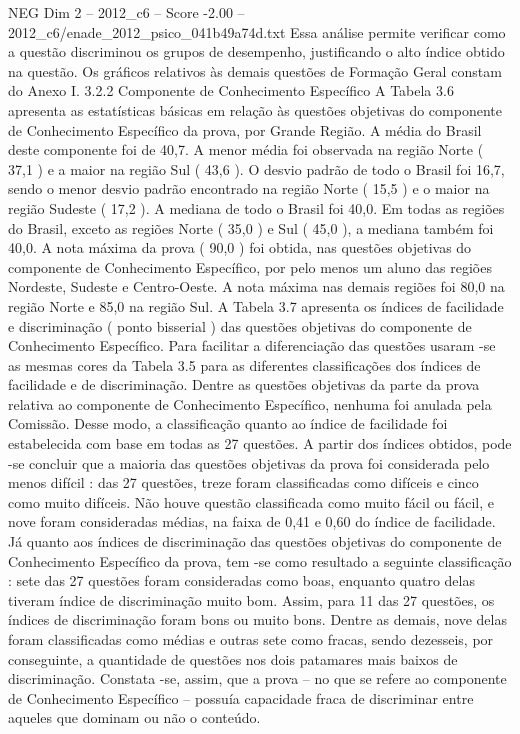 \begin{textsample}{NEG Dim 2 – 2012\_c6 – Score -2.00 – 2012\_c6/enade\_2012\_psico\_041b49a74d.txt}
Essa análise permite verificar como a questão discriminou os grupos de desempenho, justificando o alto índice obtido na questão.
Os gráficos relativos às demais questões de Formação Geral constam do Anexo I. 3.2.2 Componente de Conhecimento Específico A Tabela 3.6 apresenta as estatísticas básicas em relação às questões objetivas do componente de Conhecimento Específico da prova, por Grande Região.
A média do Brasil deste componente foi de 40,7.
A menor média foi observada na região Norte ( 37,1 ) e a maior na região Sul ( 43,6 ).
O desvio padrão de todo o Brasil foi 16,7, sendo o menor desvio padrão encontrado na região Norte ( 15,5 ) e o maior na região Sudeste ( 17,2 ).
A mediana de todo o Brasil foi 40,0.
Em todas as regiões do Brasil, exceto as regiões Norte ( 35,0 ) e Sul ( 45,0 ), a mediana também foi 40,0.
A nota máxima da prova ( 90,0 ) foi obtida, nas questões objetivas do componente de Conhecimento Específico, por pelo menos um aluno das regiões Nordeste, Sudeste e Centro-Oeste.
A nota máxima nas demais regiões foi 80,0 na região Norte e 85,0 na região Sul.
A Tabela 3.7 apresenta os índices de facilidade e discriminação ( ponto bisserial ) das questões objetivas do componente de Conhecimento Específico.
Para facilitar a diferenciação das questões usaram -se as mesmas cores da Tabela 3.5 para as diferentes classificações dos índices de facilidade e de discriminação.
Dentre as questões objetivas da parte da prova relativa ao componente de Conhecimento Específico, nenhuma foi anulada pela Comissão.
Desse modo, a classificação quanto ao índice de facilidade foi estabelecida com base em todas as 27 questões.
A partir dos índices obtidos, pode -se concluir que a maioria das questões objetivas da prova foi considerada pelo menos difícil : das 27 questões, treze foram classificadas como difíceis e cinco como muito difíceis.
Não houve questão classificada como muito fácil ou fácil, e nove foram consideradas médias, na faixa de 0,41 e 0,60 do índice de facilidade.
Já quanto aos índices de discriminação das questões objetivas do componente de Conhecimento Específico da prova, tem -se como resultado a seguinte classificação : sete das 27 questões foram consideradas como boas, enquanto quatro delas tiveram índice de discriminação muito bom.
Assim, para 11 das 27 questões, os índices de discriminação foram bons ou muito bons.
Dentre as demais, nove delas foram classificadas como médias e outras sete como fracas, sendo dezesseis, por conseguinte, a quantidade de questões nos dois patamares mais baixos de discriminação.
Constata -se, assim, que a prova – no que se refere ao componente de Conhecimento Específico – possuía capacidade fraca de discriminar entre aqueles que dominam ou não o conteúdo.

\end{textsample}
